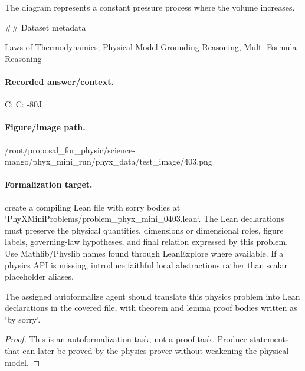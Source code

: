 The diagram represents a constant pressure process where the volume increases.

\#\# Dataset metadata

Laws of Thermodynamics; Physical Model Grounding Reasoning, Multi-Formula Reasoning

\paragraph{Recorded answer/context.}
C: C: -80J

\paragraph{Figure/image path.}
/root/proposal\_for\_physic/science-mango/phyx\_mini\_run/phyx\_data/test\_image/403.png

\paragraph{Formalization target.}
create a compiling Lean file with sorry bodies at `PhyXMiniProblems/problem\_phyx\_mini\_0403.lean`. The Lean declarations must preserve the physical quantities, dimensions or dimensional roles, figure labels, governing-law hypotheses, and final relation expressed by this problem.
Use Mathlib/Physlib names found through LeanExplore where available. If a physics API is missing, introduce faithful local abstractions rather than scalar placeholder aliases.

\begin{theorem}
\label{thm:physics:phyx_mini_0403:target}
The assigned autoformalize agent should translate this physics problem into Lean declarations in the covered file, with theorem and lemma proof bodies written as `by sorry`.
\end{theorem}
\begin{proof}
This is an autoformalization task, not a proof task. Produce statements that can later be proved by the physics prover without weakening the physical model.
\end{proof}

